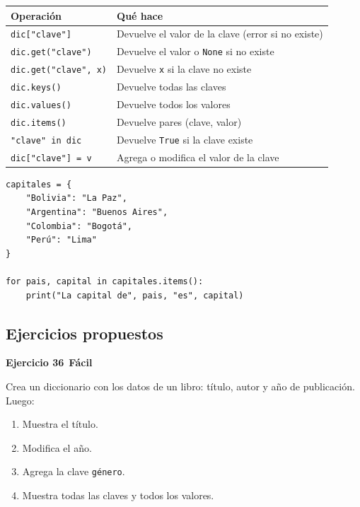 \documentclass[11pt,a4paper]{article}
\newcommand{\facil}{\textcolor{verdeSignal}{\faIcon{circle}\,\textbf{Fácil}}}
\begin{document}
\begin{table}[h]
\centering
\begin{tabularx}{\textwidth}{l X}
\toprule
\textbf{Operación} & \textbf{Qué hace} \\
\midrule
\texttt{dic["clave"]} & Devuelve el valor de la clave (error si no existe) \\
\texttt{dic.get("clave")} & Devuelve el valor o \texttt{None} si no existe \\
\texttt{dic.get("clave", x)} & Devuelve \texttt{x} si la clave no existe \\
\texttt{dic.keys()} & Devuelve todas las claves \\
\texttt{dic.values()} & Devuelve todos los valores \\
\texttt{dic.items()} & Devuelve pares (clave, valor) \\
\texttt{"clave" in dic} & Devuelve \texttt{True} si la clave existe \\
\texttt{dic["clave"] = v} & Agrega o modifica el valor de la clave \\
\bottomrule
\end{tabularx}
\end{table}

\begin{cajaEjemplo}
\begin{lstlisting}[style=pythonStyle, caption={Recorriendo un diccionario}]
capitales = {
    "Bolivia": "La Paz",
    "Argentina": "Buenos Aires",
    "Colombia": "Bogotá",
    "Perú": "Lima"
}

for pais, capital in capitales.items():
    print("La capital de", pais, "es", capital)
\end{lstlisting}
\end{cajaEjemplo}

\subsection{Ejercicios propuestos}

\begin{cajaEjercicio}
\textbf{Ejercicio 36} \facil

Crea un diccionario con los datos de un libro: título, autor y año de publicación. Luego:
\begin{enumerate}
    \item Muestra el título.
    \item Modifica el año.
    \item Agrega la clave \texttt{género}.
    \item Muestra todas las claves y todos los valores.
\end{enumerate}
\end{cajaEjercicio}
\end{document}
